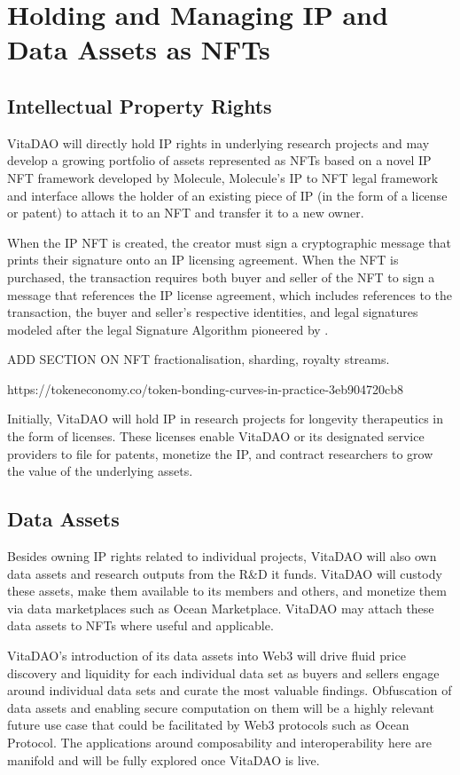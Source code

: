 \documentclass[12pt,letterpaper]{article}
\begin{document}
\section{Holding and Managing IP and Data Assets as NFTs}

\subsection{Intellectual Property Rights}
VitaDAO will directly hold IP rights in underlying research projects and may develop a growing portfolio of assets represented as NFTs based on a novel IP NFT framework developed by Molecule, Molecule’s IP to NFT legal framework and interface allows the holder of an existing piece of IP (in the form of a license or patent) to attach it to an NFT and transfer it to a new owner.

When the IP NFT is created, the creator must sign a cryptographic message that prints their signature onto an IP licensing agreement. When the NFT is purchased, the transaction requires both buyer and seller of the NFT to sign a message that references the IP license agreement, which includes references to the transaction, the buyer and seller’s respective identities, and legal signatures modeled after the legal Signature Algorithm pioneered by \citet{OpenLaw2019}.

ADD SECTION ON NFT fractionalisation, sharding, royalty streams.
 
https://tokeneconomy.co/token-bonding-curves-in-practice-3eb904720cb8

Initially, VitaDAO will hold IP in research projects for longevity therapeutics in the form of licenses. These licenses enable VitaDAO or its designated service providers to file for patents, monetize the IP, and contract researchers to grow the value of the underlying assets.

\subsection{Data Assets}
Besides owning IP rights related to individual projects, VitaDAO will also own data assets and research outputs from the R\&D it funds. VitaDAO will custody these assets, make them available to its members and others, and monetize them via data marketplaces such as Ocean Marketplace. VitaDAO may attach these data assets to NFTs where useful and applicable. 

VitaDAO’s introduction of its data assets into Web3 will drive fluid price discovery and liquidity for each individual data set as buyers and sellers engage around individual data sets and curate the most valuable findings. Obfuscation of data assets and enabling secure computation on them will be a highly relevant future use case that could be facilitated by Web3 protocols such as Ocean Protocol. The applications around composability and interoperability here are manifold and will be fully explored once VitaDAO is live.
\end{document}
